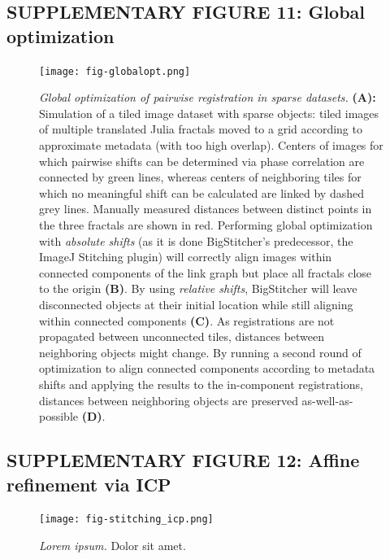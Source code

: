 \documentclass[]{spie}  %
\begin{document}
\pagebreak

\subsection*{SUPPLEMENTARY FIGURE 11: Global optimization}
\vspace{1mm}
\begin{figure}[h!]
\centerline{\texttt{[image: fig-globalopt.png]}}
\vspace{2.0mm}
\caption{\hspace{-0.5mm} \emph{Global optimization of pairwise registration in sparse datasets.} \textbf{(A):} Simulation of a tiled image dataset with sparse objects: tiled images of multiple translated Julia fractals moved to a grid according to approximate metadata (with too high overlap). Centers of images for which pairwise shifts can be determined via phase correlation are connected by green lines, whereas centers of neighboring tiles for which no meaningful shift can be calculated are linked by dashed grey lines. Manually measured distances between distinct points in the three fractals are shown in red. Performing global optimization with \emph{absolute shifts} (as it is done BigStitcher's predecessor, the ImageJ Stitching plugin) will correctly align images within connected components of the link graph but place all fractals close to the origin \textbf{(B)}. By using \emph{relative shifts}, BigStitcher will leave disconnected objects at their initial location while still aligning within connected components \textbf{(C)}. As registrations are not propagated between unconnected tiles, distances between neighboring objects might change. By running a second round of optimization to align connected components according to metadata shifts and applying the results to the in-component registrations, distances between neighboring objects are preserved as-well-as-possible \textbf{(D)}.
}
\label{fig:sup-fig-globalopt}
\end{figure}

\pagebreak


\subsection*{SUPPLEMENTARY FIGURE 12: Affine refinement via ICP}
\vspace{1mm}
\begin{figure}[h!]
\texttt{[image: fig-stitching\_icp.png]}
\vspace{-2.0mm}
\caption{\hspace{-0.5mm} \emph{Lorem ipsum.} Dolor sit amet.
}
\label{fig:sup-fig-icp}
\end{figure}
\end{document}
